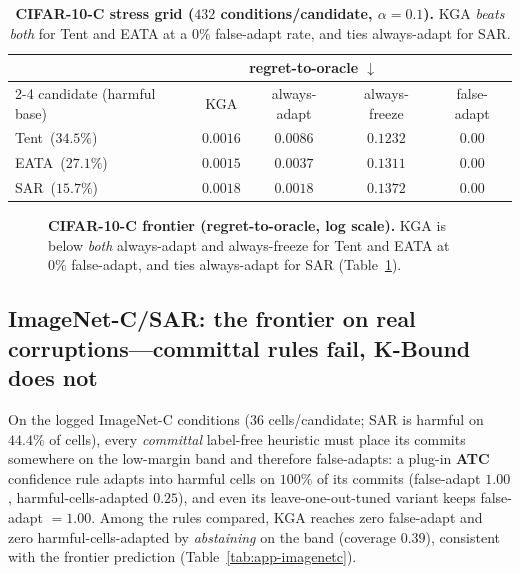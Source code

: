 \begin{table}[tb]\centering\footnotesize
\setlength{\tabcolsep}{4pt}
{%
\begin{tabular}{lcccc}
\toprule
 & \multicolumn{3}{c}{regret-to-oracle $\downarrow$} & \\
\cmidrule(lr){2-4}
candidate (harmful base) & \textsc{KGA} & always-adapt & always-freeze & false-adapt \\
\midrule
Tent \,($34.5\%$) & $\mathbf{0.0016}$ & $0.0086$ & $0.1232$ & $0.00$ \\
EATA \,($27.1\%$) & $\mathbf{0.0015}$ & $0.0037$ & $0.1311$ & $0.00$ \\
SAR \,($15.7\%$)  & $0.0018$ & $0.0018$ & $0.1372$ & $0.00$ \\
\bottomrule
\end{tabular}}
\caption{\textbf{CIFAR-10-C stress grid ($432$ conditions/candidate, $\alpha{=}0.1$).} \textsc{KGA}
\emph{beats both} for Tent and EATA at a $0\%$ false-adapt rate, and ties always-adapt for SAR.}
\label{tab:app-cifar10c}
\end{table}

\begin{figure}[tb]\centering
{}
\caption{\textbf{CIFAR-10-C frontier (regret-to-oracle, log scale).} \textsc{KGA} is below
\emph{both} always-adapt and always-freeze for Tent and EATA at $0\%$ false-adapt, and ties
always-adapt for SAR (Table~\ref{tab:app-cifar10c}).}
\label{fig:app-cifar10c}
\end{figure}

\subsection{ImageNet-C/SAR: the frontier on real corruptions---committal rules fail, K-Bound does not}
\label{app:imagenetc}
On the logged ImageNet-C conditions ($36$ cells/candidate; SAR is harmful on $44.4\%$ of cells),
every \emph{committal} label-free heuristic must place its commits somewhere on the low-margin band
and therefore false-adapts: a plug-in \textbf{ATC}~\cite{garg2022atc} confidence rule adapts into
harmful cells on $100\%$ of its commits (false-adapt $1.00$, harmful-cells-adapted $0.25$), and even
its leave-one-out-tuned variant keeps false-adapt $=1.00$. Among the rules compared,
\textsc{KGA} reaches zero false-adapt and zero harmful-cells-adapted by
\emph{abstaining} on the band (coverage $0.39$), consistent with the frontier prediction
(Table~\ref{tab:app-imagenetc}).


